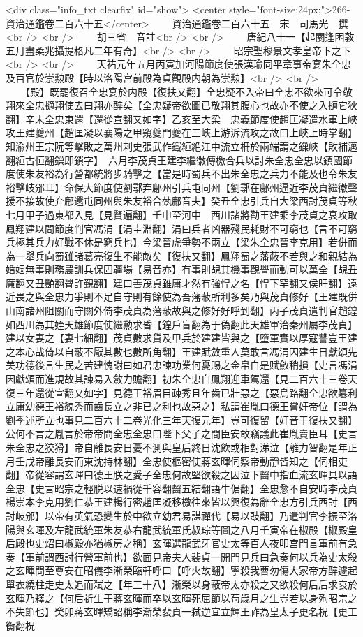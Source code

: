 <div class="info_txt clearfix" id="show">
<center style="font-size:24px;">266-資治通鑑卷二百六十五</center>
  　　資治通鑑卷二百六十五　宋　司馬光　撰<br />
<br />
　　胡三省　音註<br />
<br />
　　唐紀八十一【起閼逢困敦五月盡柔兆攝提格凡二年有奇】<br />
<br />
　　昭宗聖穆景文孝皇帝下之下<br />
<br />
　　天祐元年五月丙寅加河陽節度使張漢瑜同平章事帝宴朱全忠及百官於崇勲殿【時以洛陽宫前殿為貞觀殿内朝為崇勲】<br />
<br />
　　【殿】既罷復召全忠宴於内殿【復扶又翻】全忠疑不入帝曰全忠不欲來可令敬翔來全忠擿翔使去曰翔亦醉矣【全忠疑帝欲圖已敬翔其腹心也故亦不使之入擿它狄翻】辛未全忠東還【還從宣翻又如字】乙亥至大梁　忠義節度使趙匡凝遣水軍上峽攻王建夔州【趙匡凝以襄陽之甲窺夔門夔在三峽上游泝流攻之故曰上峽上時掌翻】知渝州王宗阮等擊敗之萬州刺史張武作鐵絙絶江中流立柵於兩端謂之鏁峽【敗補邁翻絙古恒翻鏁即鎖字】　六月李茂貞王建李繼徽傳檄合兵以討朱全忠全忠以鎮國節度使朱友裕為行營都統將步騎擊之【當是時蜀兵不出朱全忠之兵力不能及也令朱友裕擊岐邠耳】命保大節度使劉鄩弃鄜州引兵屯同州【劉鄩在鄜州逼近李茂貞繼徽聲援不接故使弃鄜還屯同州與朱友裕合埶鄜音夫】癸丑全忠引兵自大梁西討茂貞等秋七月甲子過東都入見【見賢遍翻】壬申至河中　西川諸將勸王建乘李茂貞之衰攻取鳳翔建以問節度判官馮涓【涓圭淵翻】涓曰兵者凶器殘民耗財不可窮也【言不可窮兵極其兵力好戰不休是窮兵也】今梁晉虎爭勢不兩立【梁朱全忠晉李克用】若併而為一舉兵向蜀雖諸葛亮復生不能敵矣【復扶又翻】鳳翔蜀之藩蔽不若與之和親結為婚姻無事則務農訓兵保固疆場【易音亦】有事則覘其機事觀舋而動可以萬全【覘丑廉翻又丑艷翻舋許覲翻】建曰善茂貞雖庸才然有強悍之名【悍下罕翻又侯旰翻】遠近畏之與全忠力爭則不足自守則有餘使為吾藩蔽所利多矣乃與茂貞修好【王建既併山南諸州阻關而守關外倚李茂貞為藩蔽故與之修好好呼到翻】丙子茂貞遣判官趙鍠如西川為其姪天雄節度使繼勲求昏【鍠戶盲翻為于偽翻此天雄軍治秦州屬李茂貞】建以女妻之【妻七細翻】茂貞數求貨及甲兵於建建皆與之【墮軍實以厚寇讐豈王建之本心哉倚以自蔽不厭其數也數所角翻】王建賦斂重人莫敢言馮涓因建生日獻頌先美功德後言生民之苦建愧謝曰如君忠諫功業何憂賜之金帛自是賦斂稍損【史言馮涓因獻頌而進規故其諫易入斂力贍翻】初朱全忠自鳳翔迎車駕還【見二百六十三卷天復三年還從宣翻又如字】見德王裕眉目疎秀且年齒已壯惡之【惡烏路翻全忠欲簒利立庸幼德王裕貌秀而齒長立之非已之利也故惡之】私謂崔胤曰德王嘗奸帝位【謂為劉季述所立也事見二百六十二卷光化三年天復元年】豈可復留【奸音于復扶又翻】公何不言之胤言於帝帝問全忠全忠曰陛下父子之間臣安敢竊議此崔胤賣臣耳【史言朱全忠之狡猾】帝自離長安日憂不測與皇后終日沈飲或相對涕泣【離力智翻是年正月壬戌帝離長安而東沈持林翻】全忠使樞密使蔣玄暉伺察帝動靜皆知之【伺相吏翻】帝從容謂玄暉曰德王朕之愛子全忠何故堅欲殺之因泣下齧中指血流玄暉具以語全忠【史言昭宗之輕脱以速禍從千容翻齧五結翻語牛倨翻】全忠愈不自安時李茂貞楊崇本李克用劉仁恭王建楊行密趙匡凝移檄往來皆以興復為辭全忠方引兵西討【西討岐邠】以帝有英氣恐變生於中欲立幼君易謀禪代【易以豉翻】乃遣判官李振至洛陽與玄暉及左龍武統軍朱友恭右龍武統軍氏叔琮等圖之八月壬寅帝在椒殿【椒殿皇后殿也史炤曰椒殿亦猶椒房之稱】玄暉選龍武牙官史太等百人夜叩宫門言軍前有急奏【軍前謂西討行營軍前也】欲面見帝夫人裴貞一開門見兵曰急奏何以兵為史太殺之玄暉問至尊安在昭儀李漸榮臨軒呼曰【呼火故翻】寧殺我曹勿傷大家帝方醉遽起單衣繞柱走史太追而弑之【年三十八】漸榮以身蔽帝太亦殺之又欲殺何后后求哀於玄暉乃釋之【何后祈生于蔣玄暉而卒以玄暉死屈節以苟歲月之生豈若以身殉昭宗之不失節也】癸卯蔣玄暉矯詔稱李漸榮裴貞一弑逆宜立輝王祚為皇太子更名柷【更工衡翻柷